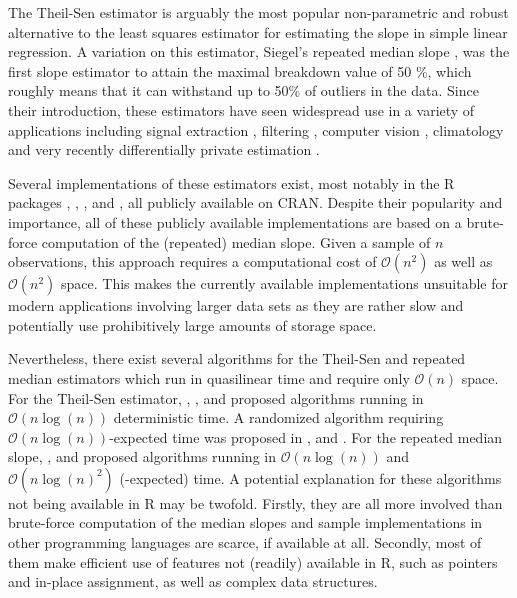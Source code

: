 The Theil-Sen estimator \citep{Theil1950, sen1968estimates} is arguably the most popular non-parametric and robust alternative to the least squares estimator for estimating the slope in simple linear regression. A variation on this estimator, Siegel's repeated median slope \citep{siegel1982robust}, was the first slope estimator to attain the maximal breakdown value of 50 \%, which roughly means that it can withstand up to 50\% of outliers in the data. Since their introduction, these estimators have seen widespread use in a variety of applications including signal extraction \citep{davies2004robust, gather2006online}, filtering  \citep{fried2006repeated, bernholt2006modified, fried2007weighted, gelper2010robust}, computer vision \cite{meer1991robust}, climatology \citep{zhang2000temperature, zhai2005trends, kosaka2013recent} and very recently differentially private estimation \citep{alabi2020differentially,fu2021attackresistant}.\par
Several implementations of these estimators exist, most notably in the R packages  \citep{R:deming},  \citep{R:zyp},  \citep{R:mblm}, and  \citep{R:RobustLinearReg}, all publicly available on CRAN. Despite their popularity and importance, all of these publicly available implementations are based on a brute-force computation of the (repeated) median slope. Given a sample of $n$ observations, this approach requires a computational cost of $\mathcal{O}(n^2)$ as well as $\mathcal{O}(n^2)$ space. This makes the currently available implementations unsuitable for modern applications involving larger data sets as they are rather slow and potentially use prohibitively large amounts of storage space.\par
Nevertheless, there exist several algorithms for the Theil-Sen and repeated median estimators which run in quasilinear time and require only $\mathcal{O}(n)$ space. For the Theil-Sen estimator, \citet{cole1989optimal}, \citet{katz1993optimal}, and \citet{bronnimann1998optimal} proposed algorithms running in $\mathcal{O}(n\log(n))$ deterministic time. A randomized algorithm requiring $\mathcal{O}(n\log(n))$-expected time was proposed in \citet{matouvsek1991randomized}, \citet{dillencourt1992randomized} and \citet{Shafer1993RandomizingOG}. For the repeated median slope, \citet{stein1992finding}, \citet{matouvsek1993efficient} and \citet{matouvsek1998efficient} proposed algorithms running in $\mathcal{O}(n\log(n))$ and $\mathcal{O}(n\log(n)^2)$ (-expected) time. A potential explanation for these algorithms not being available in R may be twofold. Firstly, they are all more involved than brute-force computation of the median slopes and sample implementations in other programming languages are scarce, if available at all. Secondly, most of them make efficient use of features not (readily) available in R, such as pointers and in-place assignment, as well as complex data structures.\par
